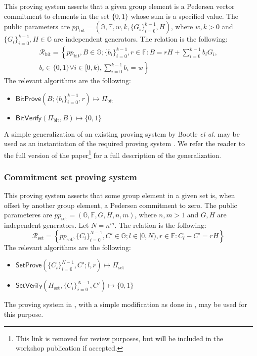 \documentclass{llncs}
\newcommand{\G}{\mathbb{G}}
\newcommand{\F}{\mathbb{F}}
\newcommand{\func}[1]{\mathsf{#1}}
\begin{document}
This proving system asserts that a given group element is a Pedersen vector commitment to elements in the set $\{0,1\}$ whose sum is a specified value.
The public parameters are $pp_{\text{bit}} = \left( \G, \F, w, k, \{G_i\}_{i=0}^{k-1}, H \right)$, where $w, k > 0$ and $\{G_i\}_{i=0}^{k-1}, H \in \G$ are independent generators.
The relation is the following:
\begin{multline*}
\mathcal{R}_{\text{bit}} = \left\{ pp_{\text{bit}}, B \in \G ; \{b_i\}_{i=0}^{k-1}, r \in \F : B = rH + \sum_{i=0}^{k-1} b_i G_i, \right. \\
\left. b_i \in \{0,1\} \forall i \in [0,k), \sum_{i=0}^{k-1} b_i = w \right\}
\end{multline*}
The relevant algorithms are the following:
\begin{itemize}
	\item $\func{BitProve}\left( B ; \{b_i\}_{i=0}^{k-1}, r \right) \mapsto \Pi_{\text{bit}}$
	\item $\func{BitVerify}\left( \Pi_{\text{bit}}, B \right) \mapsto \{0, 1\}$
\end{itemize}
A simple generalization of an existing proving system by Bootle \textit{et al.} may be used as an instantiation of the required proving system \cite{bootle}.
We refer the reader to the full version of the paper\footnote{This link is removed for review purposes, but will be included in the workshop publication if accepted.} for a full description of the generalization.

\subsubsection{Commitment set proving system}

This proving system asserts that some group element in a given set is, when offset by another group element, a Pedersen commitment to zero.
The public parameteres are $pp_{\text{set}} = (\G, \F, G, H, n, m)$, where $n, m > 1$ and $G, H$ are independent generators.
Let $N = n^m$.
The relation is the following:
\[ \mathcal{R}_{\text{set}} = \left\{ pp_{\text{set}}, \{C_i\}_{i=0}^{N-1}, C' \in \G ; l \in [0,N), r \in \F : C_l - C' = rH \right\} \]
The relevant algorithms are the following:
\begin{itemize}
	\item $\func{SetProve}\left( \{C_i\}_{i=0}^{N-1}, C' ; l, r \right) \mapsto \Pi_{\text{set}}$
	\item $\func{SetVerify}\left( \Pi_{\text{set}}, \{C_i\}_{i=0}^{N-1}, C' \right) \mapsto \{0, 1\}$
\end{itemize}
The proving system in \cite{bootle}, with a simple modification as done in \cite{spark}, may be used for this purpose.
\end{document}
